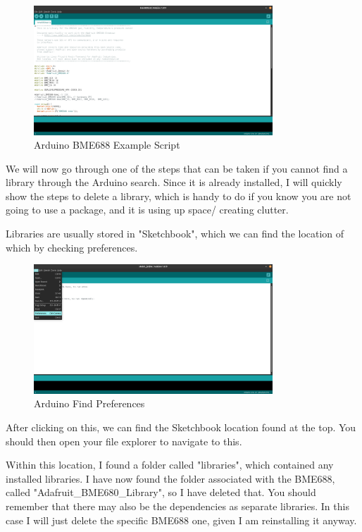 \documentclass[a4paper,11pt]{report}
\begin{document}
\begin{figure}[H]
\centering
\includegraphics[width=0.8\textwidth]{screenshots/arduinobme688examplescript}
\caption{Arduino BME688 Example Script}
\end{figure}

We will now go through one of the steps that can be taken if you cannot find a library through the Arduino search. Since it is already installed, I will quickly show the steps to delete a library, which is handy to do if you know you are not going to use a package, and it is using up space/ creating clutter.

Libraries are usually stored in "Sketchbook", which we can find the location of which by checking preferences.

\begin{figure}[H]
\centering
\includegraphics[width=0.8\textwidth]{screenshots/arduinopreferences}
\caption{Arduino Find Preferences}
\end{figure}

After clicking on this, we can find the Sketchbook location found at the top. You should then open your file explorer to navigate to this.

Within this location, I found a folder called "libraries", which contained any installed libraries. I have now found the folder associated with the BME688, called "Adafruit\_BME680\_Library", so I have deleted that. You should remember that there may also be the dependencies as separate libraries. In this case I will just delete the specific BME688 one, given I am reinstalling it anyway.
\end{document}
